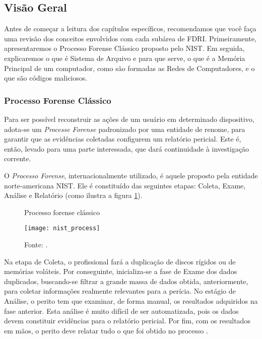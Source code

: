     \subsection{Visão Geral} \label{cap1_visao_geral}
    
    \hspace{1cm}
    Antes de começar a leitura dos capítulos específicos, recomendamos que você faça uma revisão dos conceitos envolvidos com cada subárea de FDRI. Primeiramente, apresentaremos o Processo Forense Clássico proposto pelo NIST. Em seguida, explicaremos o que é Sistema de Arquivo e para que serve, o que é a Memória Principal de um computador, como são formadas as Redes de Computadores, e o que são códigos maliciosos.
    
    \subsubsection{Processo Forense Clássico} \label{cap1_visao_geral_procfor}
    
    \hspace{1cm}
    Para ser possível reconstruir as ações de um usuário em determinado dispositivo, adota-se um \textit{Processe Forense} padronizado por uma entidade de renome, para garantir que as evidências coletadas configurem um relatório pericial. Este é, então, levado para uma parte interessada, que dará continuidade à investigação corrente.

    \vspace{4mm}

    \hspace{1cm}
    O \textit{Processo Forense}, internacionalmente utilizado, é aquele proposto pela entidade norte-americana NIST. Ele é constituído das seguintes etapas: Coleta, Exame, Análise e Relatório (como ilustra a figura \ref{nist_proc}).

    \begin{figure}[H]
    	\centering
    	\caption{Processo forense clássico}
    	\texttt{[image: nist\_process]}
    	\caption*{Fonte: .}
    	\label{nist_proc}
    \end{figure}
    
    \hspace{1cm}
    Na etapa de Coleta, o profissional fará a duplicação de discos rígidos ou de memórias voláteis. Por conseguinte, inicializa-se a fase de Exame dos dados duplicados, buscando-se filtrar a grande massa de dados obtida, anteriormente, para coletar informações realmente relevantes para a perícia. No estágio de Análise, o perito tem que examinar, de forma manual, os resultados adquiridos na fase anterior. Esta análise é muito difícil de ser automatizada, pois os dados devem constituir evidências para o relatório pericial. Por fim, com os resultados em mãos, o perito deve relatar tudo o que foi obtido no processo \cite{kent2006}.
        
